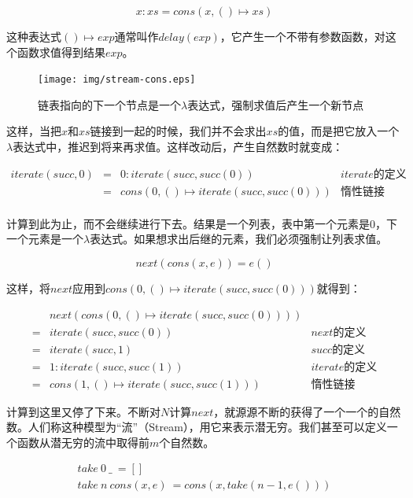 \documentclass{article}
\begin{document}
\[
x : xs = cons(x, () \mapsto xs)
\]

这种表达式$() \mapsto exp$通常叫作$delay(exp)$，它产生一个不带有参数函数，对这个函数求值得到结果$exp$。

\begin{figure}[htbp]
 \centering
 \texttt{[image: img/stream-cons.eps]}
 \caption{链表指向的下一个节点是一个$\lambda$表达式，强制求值后产生一个新节点}
 \label{fig:stream-cons}
\end{figure}

这样，当把$x$和$xs$链接到一起的时候，我们并不会求出$xs$的值，而是把它放入一个$\lambda$表达式中，推迟到将来再求值。这样改动后，产生自然数时就变成：

\[
\begin{array}{rcll}
iterate(succ, 0) & = & 0 : iterate(succ, succ(0)) & iterate\text{的定义}\\
                 & = & cons(0, () \mapsto iterate(succ, succ(0))) & \text{惰性链接} \\
\end{array}
\]

计算到此为止，而不会继续进行下去。结果是一个列表，表中第一个元素是0，下一个元素是一个$\lambda$表达式。如果想求出后继的元素，我们必须强制让列表求值。

\[
next(cons(x, e)) = e()
\]

这样，将$next$应用到$cons(0, () \mapsto iterate(succ, succ(0)))$就得到：

\[
\begin{array}{cll}
  & next(cons(0, () \mapsto iterate(succ, succ(0)))) & \\
= & iterate(succ, succ(0)) & next\text{的定义} \\
= & iterate(succ, 1) & succ\text{的定义} \\
= & 1 : iterate(succ, succ(1)) & iterate\text{的定义} \\
= & cons(1, () \mapsto iterate(succ, succ(1))) & \text{惰性链接}
\end{array}
\]

计算到这里又停了下来。不断对$N$计算$next$，就源源不断的获得了一个一个的自然数。人们称这种模型为“流”（Stream），用它来表示潜无穷。我们甚至可以定义一个函数从潜无穷的流中取得前$m$个自然数。

\[
\begin{array}{l}
take\ 0\ \_\ = [] \\
take\ n\ cons(x, e)\ = cons(x, take(n-1, e())) \\
\end{array}
\]
\end{document}
